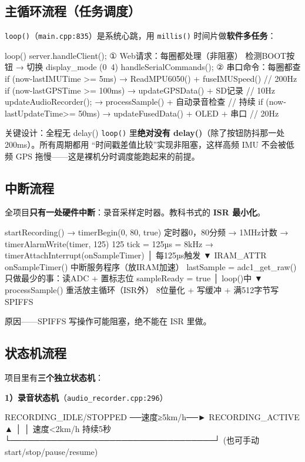 \documentclass[UTF8,11pt,a4paper]{ctexart}
\begin{document}
\subsection{主循环流程（任务调度）}
\texttt{loop()}（\texttt{main.cpp:835}）是系统心跳，用 \texttt{millis()} 时间片做\textbf{软件多任务}：
\begin{ascii}
loop() {
  server.handleClient();        ① Web请求：每圈都处理（非阻塞）
  检测BOOT按钮 → 切换 display_mode (0~4)
  handleSerialCommands();       ② 串口命令：每圈都查
  if (now-lastIMUTime   >= 5ms)   → ReadMPU6050() + fuseIMUSpeed()   // 200Hz
  if (now-lastGPSTime   >= 100ms) → updateGPSData() + SD记录          // 10Hz
  updateAudioRecorder();          → processSample() + 自动录音检查     // 持续
  if (now-lastUpdateTime>= 50ms)  → updateFusedData() + OLED + 串口   // 20Hz
}
\end{ascii}
\begin{say}{关键设计：全程无 delay()}
\texttt{loop()} 里\textbf{绝对没有 delay()}（除了按钮防抖那一处 200ms）。所有周期都用
“时间戳差值比较”实现非阻塞，这样高频 IMU 不会被低频 GPS 拖慢——这是裸机分时调度能跑起来的前提。
\end{say}

\subsection{中断流程}
全项目\textbf{只有一处硬件中断}：录音采样定时器。教科书式的 \textbf{ISR 最小化}。
\begin{ascii}
startRecording()
  → timerBegin(0, 80, true)        定时器0，80分频 → 1MHz计数
  → timerAlarmWrite(timer, 125)    125 tick = 125µs = 8kHz
  → timerAttachInterrupt(onSampleTimer)
        │ 每125µs触发
        ▼
  IRAM_ATTR onSampleTimer() {      中断服务程序（放IRAM加速）
     lastSample = adc1_get_raw()   只做最少的事：读ADC + 置标志位
     sampleReady = true
  }
        │ loop()中
        ▼
  processSample() {                重活放主循环（ISR外）
     8位量化 + 写缓冲 + 满512字节写SPIFFS
  }
\end{ascii}
原因——SPIFFS 写操作可能阻塞，绝不能在 ISR 里做。

\subsection{状态机流程}
项目里有\textbf{三个独立状态机}：

\textbf{1）录音状态机}（\texttt{audio\_recorder.cpp:296}）
\begin{ascii}
RECORDING_IDLE/STOPPED ──速度≥5km/h──► RECORDING_ACTIVE
        ▲                                   │
        │                          速度<2km/h 持续5秒
        └───────────────────────────────────┘
   (也可手动 start/stop/pause/resume)
\end{ascii}
\end{document}
